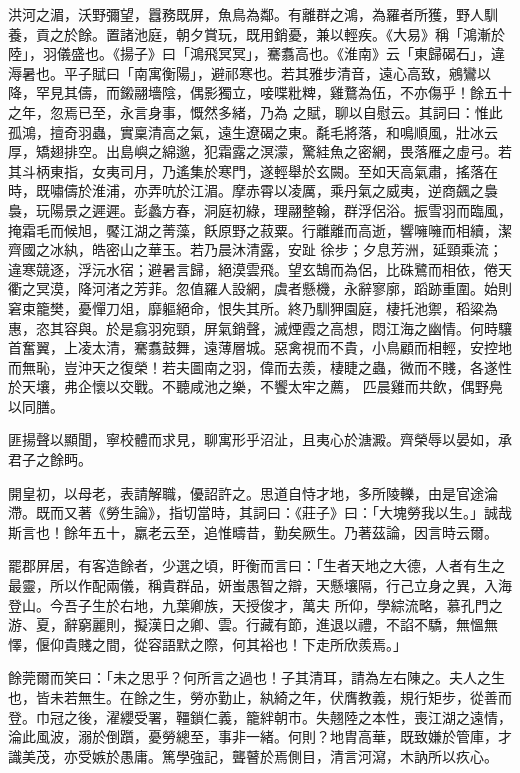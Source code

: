 \begin{pinyinscope}
 洪河之湄，沃野彌望，囂務既屏，魚鳥為鄰。有離群之鴻，為羅者所獲，野人馴養，貢之於餘。置諸池庭，朝夕賞玩，既用銷憂，兼以輕疾。《大易》稱「鴻漸於陸」，羽儀盛也。《揚子》曰「鴻飛冥冥」，騫翥高也。《淮南》云「東歸碣石」，違溽暑也。平子賦曰「南寓衡陽」，避祁寒也。若其雅步清音，遠心高致，鵷鸞以降，罕見其儔，而鎩翮墻陰，偶影獨立，唼喋粃粺，雞鶩為伍，不亦傷乎！餘五十之年，忽焉已至，永言身事，慨然多緒，乃為
 之賦，聊以自慰云。其詞曰：惟此孤鴻，擅奇羽蟲，實稟清高之氣，遠生遼碣之東。氄毛將落，和鳴順風，壯冰云厚，矯翅排空。出島嶼之綿邈，犯霜露之溟濛，驚絓魚之密網，畏落雁之虛弓。若其斗柄東指，女夷司月，乃遙集於寒門，遂輕舉於玄闕。至如天高氣肅，搖落在時，既嘯儔於淮浦，亦弄吭於江湄。摩赤霄以凌厲，乘丹氣之威夷，逆商飆之裊裊，玩陽景之遲遲。彭蠡方春，洞庭初綠，理翮整翰，群浮侶浴。振雪羽而臨風，掩霜毛而候旭，饜江湖之菁藻，飫原野之菽粟。行離離而高逝，響噰噰而相續，潔齊國之冰紈，皓密山之華玉。若乃晨沐清露，安趾
 徐步；夕息芳洲，延頸乘流；違寒競逐，浮沅水宿；避暑言歸，絕漠雲飛。望玄鵠而為侶，比硃鷺而相依，倦天衢之冥漠，降河渚之芳菲。忽值羅人設網，虞者懸機，永辭寥廓，蹈跡重圍。始則窘束籠樊，憂憚刀俎，靡軀絕命，恨失其所。終乃馴狎園庭，棲托池禦，稻粱為惠，恣其容與。於是翕羽宛頸，屏氣銷聲，滅煙霞之高想，悶江海之幽情。何時驤首奮翼，上凌太清，騫翥鼓舞，遠薄層城。惡禽視而不貴，小鳥顧而相輕，安控地而無恥，豈沖天之復榮！若夫圖南之羽，偉而去羨，棲睫之蟲，微而不賤，各遂性於天壤，弗企懷以交戰。不聽咸池之樂，不饗太牢之薦，
 匹晨雞而共飲，偶野鳧以同膳。



 匪揚聲以顯聞，寧校體而求見，聊寓形乎沼沚，且夷心於溏澱。齊榮辱以晏如，承君子之餘眄。



 開皇初，以母老，表請解職，優詔許之。思道自恃才地，多所陵轢，由是官途淪滯。既而又著《勞生論》，指切當時，其詞曰：《莊子》曰：「大塊勞我以生。」誠哉斯言也！餘年五十，羸老云至，追惟疇昔，勤矣厥生。乃著茲論，因言時云爾。



 罷郡屏居，有客造餘者，少選之頃，盱衡而言曰：「生者天地之大德，人者有生之最靈，所以作配兩儀，稱貴群品，妍蚩愚智之辯，天懸壤隔，行己立身之異，入海登山。今吾子生於右地，九葉卿族，天授俊才，萬夫
 所仰，學綜流略，慕孔門之游、夏，辭窮麗則，擬漢日之卿、雲。行藏有節，進退以禮，不諂不驕，無慍無懌，偃仰貴賤之間，從容語默之際，何其裕也！下走所欣羨焉。」



 餘莞爾而笑曰：「未之思乎？何所言之過也！子其清耳，請為左右陳之。夫人之生也，皆未若無生。在餘之生，勞亦勤止，紈綺之年，伏膺教義，規行矩步，從善而登。巾冠之後，濯纓受署，韁鎖仁義，籠絆朝市。失翹陸之本性，喪江湖之遠情，淪此風波，溺於倒躓，憂勞總至，事非一緒。何則？地胄高華，既致嫌於管庫，才識美茂，亦受嫉於愚庸。篤學強記，聾瞽於焉側目，清言河瀉，木訥所以疚心。




\end{pinyinscope}
